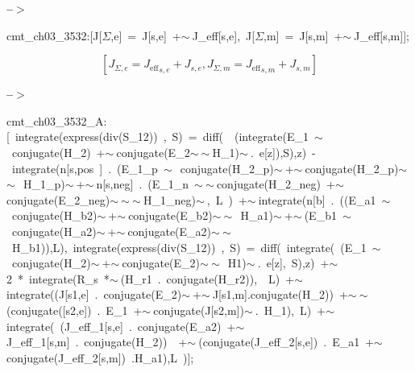\documentclass[fleqn]{article}
\begin{document}
\noindent
\begin{minipage}[t]{4.000000em}\color{red}\bfseries
 --\ensuremath{\ensuremath{>}}	
\end{minipage}
\begin{minipage}[t]{\textwidth}\color{blue}
cmt\_ch03\_3532:[J[\ensuremath{\Sigma},e]\ =\ J[s,e]\ +\ensuremath{\sim\ }J\_eff[s,e],\ J[\ensuremath{\Sigma},m]\ =\ J[s,m]\ +\ensuremath{\sim\ }J\_eff[s,m]];
\end{minipage}
\[\displaystyle \tag{cmt\_ ch03\_ 3532} 
\left[ {J_{\Sigma ,e}}={{{J_{\ensuremath{\mathrm{eff}}}}}_{s,e}}+{J_{s,e}}\operatorname{,}{J_{\Sigma ,m}}={{{J_{\ensuremath{\mathrm{eff}}}}}_{s,m}}+{J_{s,m}}\right] \mbox{}
\]


\noindent
\begin{minipage}[t]{4.000000em}\color{red}\bfseries
 --\ensuremath{\ensuremath{>}}	
\end{minipage}
\begin{minipage}[t]{\textwidth}\color{blue}
cmt\_ch03\_3532\_A:[\ integrate(express(div(S\_12))\ ,\ S)\ =\ diff(\ \ (integrate(E\_1\ \ensuremath{\sim\ }\ conjugate(H\_2)\ +\ensuremath{\sim\ }conjugate(E\_2\ensuremath{\sim\ }\ensuremath{\sim\ }H\_1)\ensuremath{\sim\ }.\ e[z]),S),z)\ -\ integrate(n[s,pos\ ]\ .\ (E\_1\_p\ \ensuremath{\sim\ }\ conjugate(H\_2\_p)\ensuremath{\sim\ }+\ensuremath{\sim\ }conjugate(H\_2\_p)\ensuremath{\sim\ }\ensuremath{\sim\ }\ H\_1\_p)\ensuremath{\sim\ }+\ensuremath{\sim\ }n[s,neg]\ .\ (E\_1\_n\ \ensuremath{\sim\ }\ensuremath{\sim\ }conjugate(H\_2\_neg)\ +\ensuremath{\sim\ }conjugate(E\_2\_neg)\ensuremath{\sim\ }\ensuremath{\sim\ }\ensuremath{\sim\ }H\_1\_neg)\ensuremath{\sim\ },\ L\ )\ +\ensuremath{\sim\ }integrate(n[b]\ .\ ((E\_a1\ \ensuremath{\sim\ }\ conjugate(H\_b2)\ensuremath{\sim\ }+\ensuremath{\sim\ }conjugate(E\_b2)\ensuremath{\sim\ }\ensuremath{\sim\ }\ H\_a1)\ensuremath{\sim\ }+\ensuremath{\sim\ }(E\_b1\ \ensuremath{\sim\ }\ conjugate(H\_a2)\ensuremath{\sim\ }+\ensuremath{\sim\ }conjugate(E\_a2)\ensuremath{\sim\ }\ensuremath{\sim\ }\ H\_b1)),L),\ integrate(express(div(S\_12))\ ,\ S)\ =\ diff(\ integrate(\ (E\_1\ \ensuremath{\sim\ }\ conjugate(H\_2)\ensuremath{\sim\ }+\ensuremath{\sim\ }conjugate(E\_2)\ensuremath{\sim\ }\ensuremath{\sim\ }\ H1)\ensuremath{\sim\ }.\ e[z],\ S),z)\ +\ensuremath{\sim\ }2\ *\ integrate(R\_s\ *\ensuremath{\sim\ }(H\_r1\ .\ conjugate(H\_r2)),\ \ L)\ +\ensuremath{\sim\ }integrate((J[s1,e]\ .\ conjugate(E\_2)\ensuremath{\sim\ }+\ensuremath{\sim\ }J[s1,m].conjugate(H\_2))\ +\ensuremath{\sim\ }\ensuremath{\sim\ }(conjugate([s2,e])\ .\ E\_1\ +\ensuremath{\sim\ }conjugate(J[s2,m])\ensuremath{\sim\ }.\ H\_1),\ L)\ +\ensuremath{\sim\ }integrate(\ (J\_eff\_1[s,e]\ .\ conjugate(E\_a2)\ +\ensuremath{\sim\ }J\_eff\_1[s,m]\ .\ conjugate(H\_2))\ \ +\ensuremath{\sim\ }(conjugate(J\_eff\_2[s,e])\ .\ E\_a1\ +\ensuremath{\sim\ }conjugate(J\_eff\_2[s,m])\ .H\_a1),L\ )];
\end{minipage}
\end{document}

